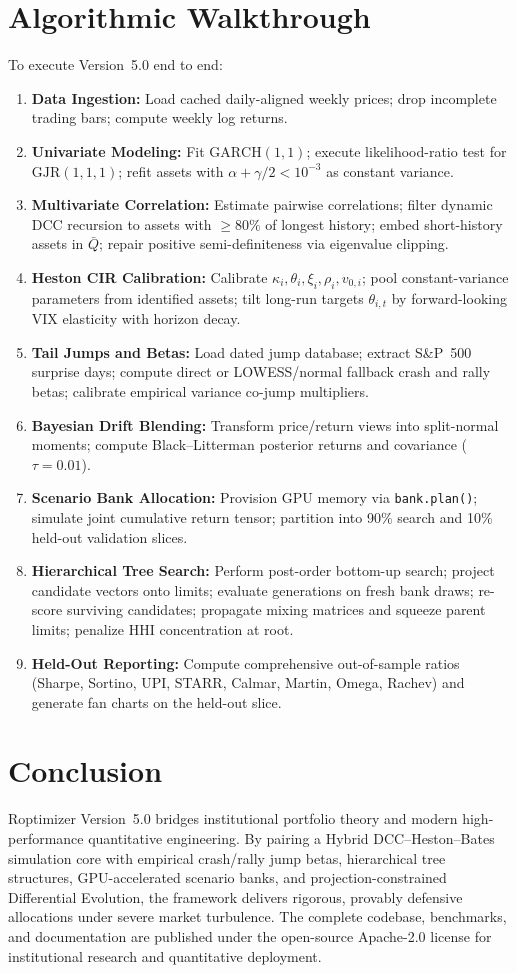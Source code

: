 \documentclass[11pt]{article}
\begin{document}
\section{Algorithmic Walkthrough}
To execute Version~5.0 end to end:
\begin{enumerate}[nosep]
\item \textbf{Data Ingestion:} Load cached daily-aligned weekly prices; drop incomplete trading bars; compute weekly log returns.
\item \textbf{Univariate Modeling:} Fit $\mathrm{GARCH}(1,1)$; execute likelihood-ratio test for $\mathrm{GJR}(1,1,1)$; refit assets with $\alpha + \gamma/2 < 10^{-3}$ as constant variance.
\item \textbf{Multivariate Correlation:} Estimate pairwise correlations; filter dynamic DCC recursion to assets with $\ge 80\%$ of longest history; embed short-history assets in $\bar{Q}$; repair positive semi-definiteness via eigenvalue clipping.
\item \textbf{Heston CIR Calibration:} Calibrate $\kappa_i, \theta_i, \xi_i, \rho_i, v_{0, i}$; pool constant-variance parameters from identified assets; tilt long-run targets $\theta_{i, t}$ by forward-looking VIX elasticity with horizon decay.
\item \textbf{Tail Jumps and Betas:} Load dated jump database; extract S\&P~500 surprise days; compute direct or LOWESS/normal fallback crash and rally betas; calibrate empirical variance co-jump multipliers.
\item \textbf{Bayesian Drift Blending:} Transform price/return views into split-normal moments; compute Black--Litterman posterior returns and covariance ($\tau = 0.01$).
\item \textbf{Scenario Bank Allocation:} Provision GPU memory via \texttt{bank.plan()}; simulate joint cumulative return tensor; partition into 90\% search and 10\% held-out validation slices.
\item \textbf{Hierarchical Tree Search:} Perform post-order bottom-up search; project candidate vectors onto limits; evaluate generations on fresh bank draws; re-score surviving candidates; propagate mixing matrices and squeeze parent limits; penalize HHI concentration at root.
\item \textbf{Held-Out Reporting:} Compute comprehensive out-of-sample ratios (Sharpe, Sortino, UPI, STARR, Calmar, Martin, Omega, Rachev) and generate fan charts on the held-out slice.
\end{enumerate}

\section{Conclusion}
Roptimizer Version~5.0 bridges institutional portfolio theory and modern high-performance quantitative engineering.
By pairing a Hybrid DCC--Heston--Bates simulation core with empirical crash/rally jump betas, hierarchical tree
structures, GPU-accelerated scenario banks, and projection-constrained Differential Evolution, the framework
delivers rigorous, provably defensive allocations under severe market turbulence. The complete codebase,
benchmarks, and documentation are published under the open-source Apache-2.0 license for institutional research
and quantitative deployment.
\end{document}
